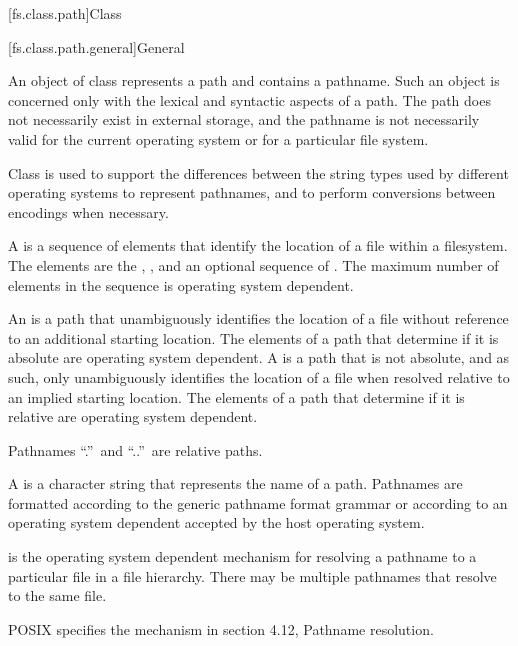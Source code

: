 [fs.class.path]{Class }

[fs.class.path.general]{General}

%
\pnum
An object of class  represents a path
and contains a pathname.
Such an object is concerned only with the lexical and syntactic aspects
of a path. The path does not necessarily exist in external storage, and the
pathname is not necessarily valid for the current operating
system or for a particular file system.

\pnum
\begin{note}
Class  is used to support the differences between the string types used by different operating systems to represent pathnames, and to perform conversions between encodings when necessary.
\end{note}

\pnum
A  is
a sequence of elements that identify
the location of a file within a filesystem.
The elements are the
,
,
and an optional sequence of .
The maximum number of elements in the sequence is
operating system dependent.

\pnum
An  is a path that unambiguously
identifies the location of a file without reference to an additional starting
location. The elements of a path that determine if it is absolute are
operating system dependent.
A  is
a path that is not absolute, and as such, only unambiguously
identifies the location of a file when resolved relative to
an implied starting location. The elements of a path that determine if it is
relative are operating system dependent.
\begin{note}
Pathnames ``.''\ and ``..''\ are relative paths.
\end{note}

\pnum
A  is
a character string that represents the name of a path. Pathnames are
formatted according to the generic pathname format grammar
or according to an
operating system dependent
 accepted by the host operating system.

\pnum
{}
is the operating system dependent mechanism for resolving
a pathname to a particular file in a file hierarchy. There may be multiple
pathnames that resolve to the same file.
\begin{example}
POSIX specifies the mechanism in section 4.12, Pathname resolution.
\end{example}

